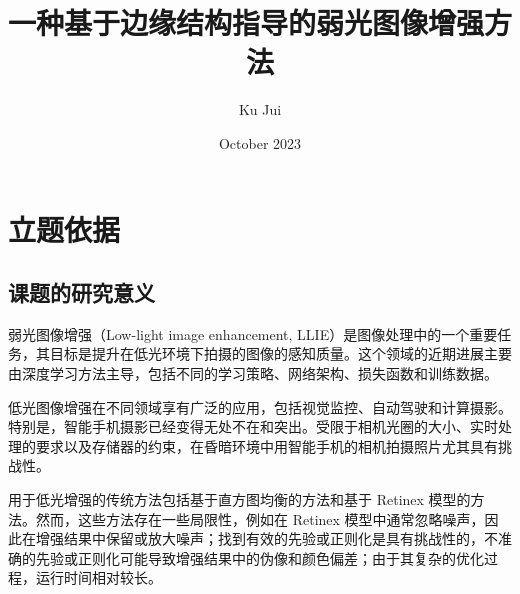 \documentclass[a4paper]{ctexart}
\begin{document}
	
	\title{\songti {}一种基于边缘结构指导的弱光图像增强方法}
	\author{\textrm{Ku Jui}}
	\date{\textrm{October 2023}}
	\maketitle
	
	\newpage
	
	\renewcommand{\contentsname}{目录}
	\renewcommand{\cfttoctitlefont}{\hfill\Large\bfseries}
	\renewcommand{\cftaftertoctitle}{\hfill}
	\renewcommand{\tablename}{表}
	\renewcommand{\figurename}{图}
	
	
	\tableofcontents  %
	
	\newpage
	
	\section{立题依据}
	
	\subsection{课题的研究意义}
	
	弱光图像增强（Low-light image enhancement, LLIE）是图像处理中的一个重要任务，其目标是提升在低光环境下拍摄的图像的感知质量。这个领域的近期进展主要由深度学习方法主导，包括不同的学习策略、网络架构、损失函数和训练数据。
	
	低光图像增强在不同领域享有广泛的应用，包括视觉监控、自动驾驶和计算摄影。特别是，智能手机摄影已经变得无处不在和突出。受限于相机光圈的大小、实时处理的要求以及存储器的约束，在昏暗环境中用智能手机的相机拍摄照片尤其具有挑战性。
	
	用于低光增强的传统方法包括基于直方图均衡的方法和基于 Retinex 模型的方法。然而，这些方法存在一些局限性，例如在 Retinex 模型中通常忽略噪声\cite{liu2021retinex, xu2020learning}，因此在增强结果中保留或放大噪声；找到有效的先验或正则化是具有挑战性的，不准确的先验或正则化可能导致增强结果中的伪像和颜色偏差；由于其复杂的优化过程，运行时间相对较长。
	
\end{document}
